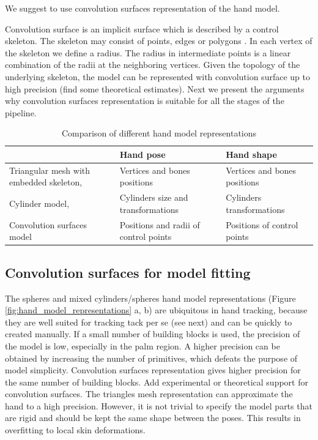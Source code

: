We suggest to use convolution surfaces representation of the hand model. 

Convolution surface is an implicit surface which is described by a control skeleton. The skeleton may consist of points, edges or polygons \cite{bloomenthal1991convolution}. In each vertex of the skeleton we define a radius. The radius in intermediate points is a linear combination of the radii at the neighboring vertices. Given the topology of the underlying skeleton, the model can be represented with convolution surface up to high precision \textcolor{mygray}{(find some theoretical estimates).} Next we present the arguments why convolution surfaces representation is suitable for all the stages of the pipeline.

\begin{table}[!ht] 
	\centering
	\begin{tabular}{|p{2.5cm}|p{2.5cm}|p{2.5cm}|}
	\hline
 	& Hand pose  & Hand shape  \\
	\hline
	Triangular mesh with embedded skeleton, \cite{taylor2014user} & Vertices and bones positions & Vertices and bones positions	 \\
	\hline
	Cylinder model, \cite{tagliasacchi2015robust} & Cylinders size and transformations & Cylinders transformations	 \\
	\hline
	Convolution surfaces model & Positions and radii of control points & Positions of control points \\
	\hline
	\end{tabular}
	\vspace{1em}
	\caption{Comparison of different hand model representations}
	\label{table:representation_dependent_components}
\end{table}

\subsection{Convolution surfaces for model fitting}
The spheres and mixed cylinders/spheres hand model representations (Figure \ref{fig:hand_model_representations} a, b) are ubiquitous in hand tracking, because they are well suited for tracking tack per se (see next) and can be quickly to created manually. If a small number of  building blocks is used, the precision of the model is low, especially in the palm region. A higher precision can be obtained by increasing the number of primitives, which defeats the purpose of model simplicity. Convolution surfaces representation gives higher precision for the same number of building blocks. \textcolor{mygray}{Add experimental or theoretical support for convolution surfaces.}
The triangles mesh representation can approximate the hand to a high precision. However, it is not trivial to specify the model parts that are rigid and should be kept the same shape between the poses. This results in overfitting to local skin deformations. 

